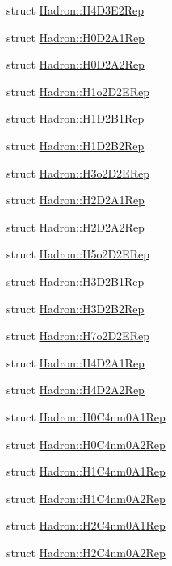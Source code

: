 \begin{DoxyCompactItemize}
struct \mbox{\hyperlink{structHadron_1_1H4D3E2Rep}{Hadron\+::\+H4\+D3\+E2\+Rep}}
\item 
struct \mbox{\hyperlink{structHadron_1_1H0D2A1Rep}{Hadron\+::\+H0\+D2\+A1\+Rep}}
\item 
struct \mbox{\hyperlink{structHadron_1_1H0D2A2Rep}{Hadron\+::\+H0\+D2\+A2\+Rep}}
\item 
struct \mbox{\hyperlink{structHadron_1_1H1o2D2ERep}{Hadron\+::\+H1o2\+D2\+E\+Rep}}
\item 
struct \mbox{\hyperlink{structHadron_1_1H1D2B1Rep}{Hadron\+::\+H1\+D2\+B1\+Rep}}
\item 
struct \mbox{\hyperlink{structHadron_1_1H1D2B2Rep}{Hadron\+::\+H1\+D2\+B2\+Rep}}
\item 
struct \mbox{\hyperlink{structHadron_1_1H3o2D2ERep}{Hadron\+::\+H3o2\+D2\+E\+Rep}}
\item 
struct \mbox{\hyperlink{structHadron_1_1H2D2A1Rep}{Hadron\+::\+H2\+D2\+A1\+Rep}}
\item 
struct \mbox{\hyperlink{structHadron_1_1H2D2A2Rep}{Hadron\+::\+H2\+D2\+A2\+Rep}}
\item 
struct \mbox{\hyperlink{structHadron_1_1H5o2D2ERep}{Hadron\+::\+H5o2\+D2\+E\+Rep}}
\item 
struct \mbox{\hyperlink{structHadron_1_1H3D2B1Rep}{Hadron\+::\+H3\+D2\+B1\+Rep}}
\item 
struct \mbox{\hyperlink{structHadron_1_1H3D2B2Rep}{Hadron\+::\+H3\+D2\+B2\+Rep}}
\item 
struct \mbox{\hyperlink{structHadron_1_1H7o2D2ERep}{Hadron\+::\+H7o2\+D2\+E\+Rep}}
\item 
struct \mbox{\hyperlink{structHadron_1_1H4D2A1Rep}{Hadron\+::\+H4\+D2\+A1\+Rep}}
\item 
struct \mbox{\hyperlink{structHadron_1_1H4D2A2Rep}{Hadron\+::\+H4\+D2\+A2\+Rep}}
\item 
struct \mbox{\hyperlink{structHadron_1_1H0C4nm0A1Rep}{Hadron\+::\+H0\+C4nm0\+A1\+Rep}}
\item 
struct \mbox{\hyperlink{structHadron_1_1H0C4nm0A2Rep}{Hadron\+::\+H0\+C4nm0\+A2\+Rep}}
\item 
struct \mbox{\hyperlink{structHadron_1_1H1C4nm0A1Rep}{Hadron\+::\+H1\+C4nm0\+A1\+Rep}}
\item 
struct \mbox{\hyperlink{structHadron_1_1H1C4nm0A2Rep}{Hadron\+::\+H1\+C4nm0\+A2\+Rep}}
\item 
struct \mbox{\hyperlink{structHadron_1_1H2C4nm0A1Rep}{Hadron\+::\+H2\+C4nm0\+A1\+Rep}}
\item 
struct \mbox{\hyperlink{structHadron_1_1H2C4nm0A2Rep}{Hadron\+::\+H2\+C4nm0\+A2\+Rep}}

\end{DoxyCompactItemize}
